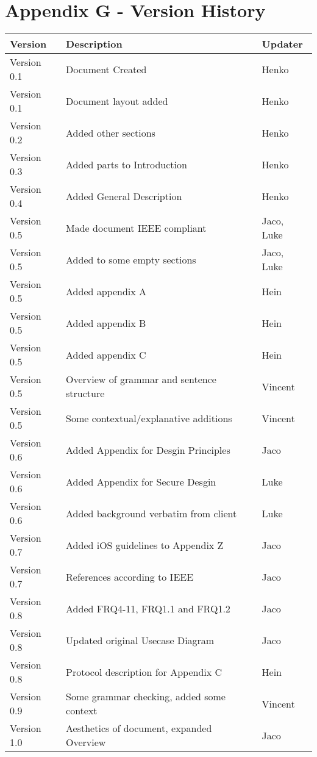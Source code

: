 \section{Appendix G - Version History}
\begin{center}
\begin{tabular}{|l|l|l|}
\hline
\textbf{Version} & \textbf{Description}&\textbf{Updater}\\ 
\hline
Version 0.1 & Document Created&Henko\\ 
\hline
Version 0.1 & Document layout added&Henko\\ 
\hline
Version 0.2 & Added other sections&Henko\\ 
\hline
Version 0.3 & Added parts to Introduction&Henko\\ 
\hline
Version 0.4 & Added General Description&Henko\\ 
\hline
Version 0.5 & Made document IEEE compliant&Jaco, Luke\\
\hline
Version 0.5 & Added to some empty sections &Jaco, Luke\\ 
\hline
Version 0.5 & Added appendix A&Hein\\ 
\hline
Version 0.5 & Added appendix B&Hein\\ 
\hline
Version 0.5 & Added appendix C&Hein\\ 
\hline
Version 0.5 & Overview of grammar and sentence structure& Vincent\\
\hline
Version 0.5 & Some contextual/explanative additions & Vincent\\
\hline
Version 0.6 & Added Appendix for Desgin Principles& Jaco\\
\hline
Version 0.6 & Added Appendix for Secure Desgin& Luke\\
\hline
Version 0.6 & Added background verbatim from client& Luke\\
\hline
Version 0.7 & Added iOS guidelines to Appendix Z& Jaco\\
\hline
Version 0.7 & References according to IEEE& Jaco\\
\hline
Version 0.8 & Added FRQ4-11, FRQ1.1 and FRQ1.2& Jaco\\
\hline
Version 0.8 & Updated original Usecase Diagram& Jaco\\
\hline
Version 0.8 & Protocol description for Appendix C& Hein\\
\hline
Version 0.9 & Some grammar checking, added some context & Vincent\\
\hline
Version 1.0 & Aesthetics of document, expanded Overview& Jaco\\

\end{tabular}
\end{center}

